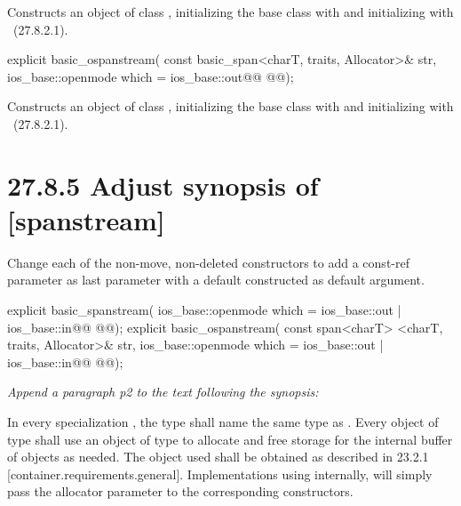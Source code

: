 \documentclass[ebook,11pt,article]{memoir}
\begin{document}
\begin{itemdescr}
\pnum
\effects
Constructs an object of class
,
initializing the base class with
and initializing  with
~({27.8.2.1}).
\end{itemdescr}

\begin{itemdecl}
explicit basic_ospanstream(
  const basic_span<charT, traits, Allocator>& str,
  ios_base::openmode which = ios_base::out@\ins{,}@
  @@);
\end{itemdecl}

\begin{itemdescr}
\pnum
\effects
Constructs an object of class
,
initializing the base class with
and initializing  with
~({27.8.2.1}).
\end{itemdescr}


\section{27.8.5 Adjust synopsis of  [spanstream]}
Change each of the non-move, non-deleted constructors to add a const-ref  parameter as last parameter with a default constructed  as default argument. 
\begin{codeblock}
explicit basic_spanstream(
             ios_base::openmode which = ios_base::out | ios_base::in@\ins{,}@
             @@);
explicit basic_ospanstream(
             const span<charT> <charT, traits, Allocator>& str,
             ios_base::openmode which = ios_base::out | ios_base::in@\ins{,}@
             @@);
\end{codeblock}

\textit{Append a paragraph p2 to the text following the synopsis:}

\begin{insrt}
\pnum
In every specialization , the type  shall name the same type as . Every object of type  shall use an object of type  to allocate and free storage for the internal buffer of  objects as needed. The  object used shall be obtained as described in 23.2.1 [container.requirements.general].
\enternote
Implementations using  internally, will simply pass the allocator parameter to the corresponding  constructors.
\exitnote
\end{insrt}
\end{document}
